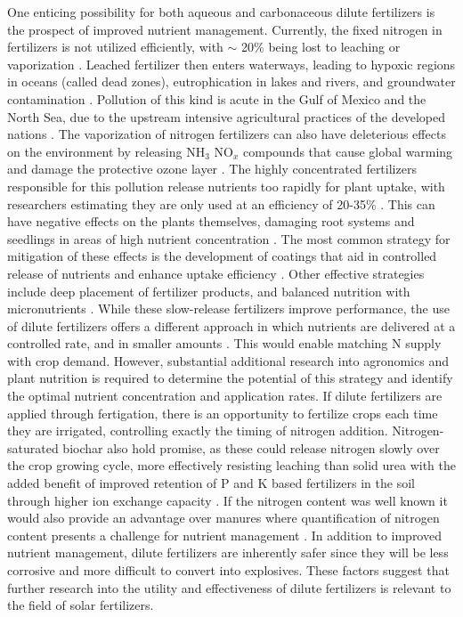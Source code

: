 One enticing possibility for both aqueous and carbonaceous dilute fertilizers is the prospect of improved nutrient management. Currently, the fixed nitrogen in fertilizers is not utilized efficiently, with $\sim$ 20\% being lost to leaching or vaporization \cite{Smil_1999_2, Naz_2016}. Leached fertilizer then enters waterways, leading to hypoxic regions in oceans (called dead zones), eutrophication in lakes and rivers, and groundwater contamination \cite{Diaz2008,Conley_2009,Shindo_2006}.  Pollution of this kind is acute in the Gulf of Mexico and the North Sea, due to the upstream intensive agricultural practices of the developed nations \cite{Diaz2008,Conley_2009}. The vaporization of nitrogen fertilizers can also have deleterious effects on the environment by releasing NH$_3$ NO$_x$ compounds that cause global warming and damage the protective ozone layer \cite{Ravishankara_2009}. The highly concentrated fertilizers responsible for this pollution release nutrients too rapidly for plant uptake, with researchers estimating they are only used at an efficiency of 20-35\% \cite{Naz_2016}. This can have negative effects on the plants themselves, damaging root systems and seedlings in areas of high nutrient concentration \cite{Morgan2009}. The most common strategy for mitigation of these effects is the development of coatings that aid in controlled release of nutrients and enhance uptake efficiency \cite{Naz_2016}. Other effective strategies include deep placement of fertilizer products, and balanced nutrition with micronutrients \cite{angle2017role}. While these slow-release fertilizers improve performance, the use of dilute fertilizers offers a different approach in which nutrients are delivered at a controlled rate, and in smaller amounts \cite{kadyampakeni_2015, Flink_1995}. This would enable matching N supply with crop demand. However, substantial additional research into agronomics and plant nutrition is required to determine the potential of this strategy and identify the optimal nutrient concentration and application rates. If dilute fertilizers are applied through fertigation, there is an opportunity to fertilize crops each time they are irrigated, controlling exactly the timing of nitrogen addition. Nitrogen-saturated biochar also hold promise, as these could release nitrogen slowly over the crop growing cycle, more effectively resisting leaching than solid urea with the added benefit of improved retention of P and K based fertilizers in the soil through higher ion exchange capacity \cite{Glaser2002}. If the nitrogen content was well known it would also provide an advantage over manures where quantification of nitrogen content presents a challenge for nutrient management \cite{Ye}. In addition to improved nutrient management, dilute fertilizers are inherently safer since they will be less corrosive and more difficult to convert into explosives. These factors suggest that further research into the utility and effectiveness of dilute fertilizers is relevant to the field of solar fertilizers.

